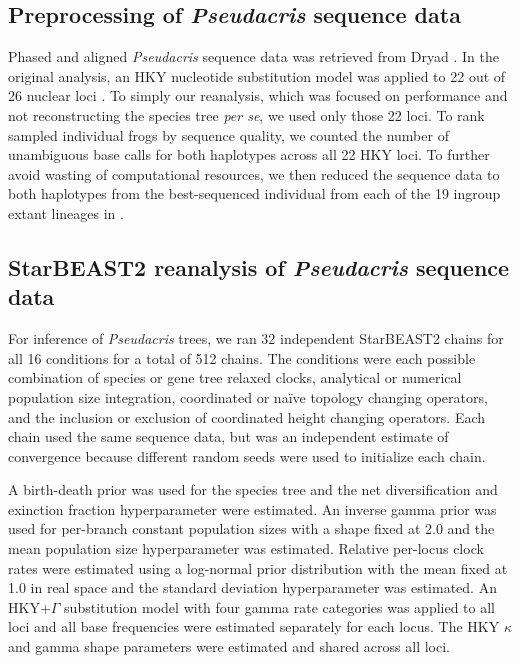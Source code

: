 \documentclass[12pt]{article}
\begin{document}
\subsection*{Preprocessing of \textit{Pseudacris} sequence data}

Phased and aligned \textit{Pseudacris} sequence data was retrieved from Dryad
\citep{dryad_23rc0}. In the original analysis, an HKY nucleotide substitution
model was applied to 22 out of 26 nuclear loci \citep{Barrow201478}. To simply
our reanalysis, which was focused on performance and not reconstructing the
species tree \textit{per se}, we used only those 22 loci. To rank sampled
individual frogs by sequence quality, we counted the number of unambiguous base
calls for both haplotypes across all 22 HKY loci. To further avoid wasting of
computational resources, we then reduced the sequence data to both haplotypes
from the best-sequenced individual from each of the 19 ingroup extant lineages
in \cite{Barrow201478}.

\subsection*{StarBEAST2 reanalysis of \textit{Pseudacris} sequence data}

For inference of \textit{Pseudacris} trees, we ran 32 independent StarBEAST2
chains for all 16 conditions for a total of 512 chains. The conditions were each
possible combination of species or gene tree relaxed clocks, analytical or
numerical population size integration, coordinated or na\"ive topology changing
operators, and the inclusion or exclusion of coordinated height changing
operators. Each chain used the same sequence data, but was an independent
estimate of convergence because different random seeds were used to initialize
each chain.

A birth-death prior was used for the species tree and the net diversification
and exinction fraction hyperparameter were estimated. An inverse gamma prior was
used for per-branch constant population sizes with a shape fixed at 2.0 and the
mean population size hyperparameter was estimated. Relative per-locus clock
rates were estimated using a log-normal prior distribution with the mean fixed
at 1.0 in real space and the standard deviation hyperparameter was estimated. An
HKY+$\Gamma$ substitution model with four gamma rate categories was applied to
all loci and all base frequencies were estimated separately for each locus. The
HKY $\kappa$ and gamma shape parameters were estimated and shared across all loci.
\end{document}

